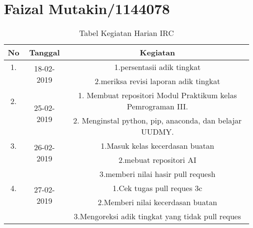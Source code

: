 \chapter{Faizal Mutakin/1144078}
\begin{table}[h]
\caption{Tabel Kegiatan Harian IRC}
\centering
\begin{tabular}{|c|c|c|}
\hline
No&Tanggal&Kegiatan\\
\hline
1.&\multirow{2}{*}{18-02-2019}&1.persentasii adik tingkat\\
&&2.meriksa revisi laporan adik tingkat\\
\hline
2.&\multirow{2}{*}{25-02-2019}&1. Membuat repositori Modul Praktikum kelas Pemrograman III.\\
&&2. Menginstal python, pip, anaconda, dan belajar UUDMY.\\
\hline
3.&\multirow{2}{*}{26-02-2019}&1.Masuk kelas kecerdasan buatan\\
&&2.mebuat repositori AI\\
&&3.memberi nilai hasir pull requesh\\
\hline
4.&\multirow{2}{*}{27-02-2019}&1.Cek tugas pull reques 3c\\
&&2.Memberi nilai kecerdasan buatan\\
&&3.Mengoreksi adik tingkat yang tidak pull reques\\
\hline
\end{tabular}
\label{table:contoh}
\end{table}